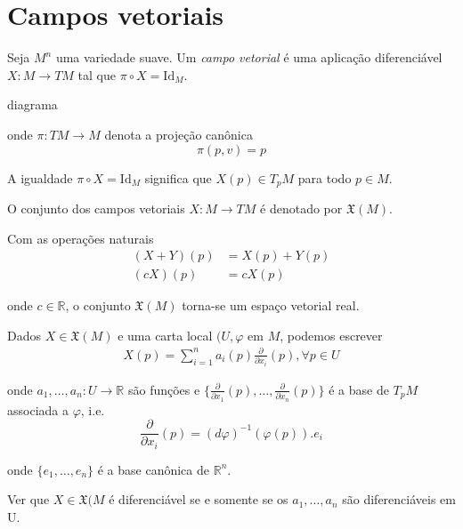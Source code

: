 \section{Campos vetoriais}

\begin{defi}
	Seja $M^n$ uma variedade suave. Um \emph{campo vetorial} é uma aplicação diferenciável $X: M \rightarrow TM$ tal que $\pi \circ X = \text{Id}_M$.
	
	diagrama
	
	onde $\pi: TM \rightarrow M$ denota a projeção canônica
	\begin{equation*}
		\pi(p,v) = p
	\end{equation*}
\end{defi}

\begin{obse}
	A igualdade $\pi \circ X = \text{Id}_M$ significa que $X(p) \in T_p M$ para todo $p \in M$.
\end{obse}

\begin{nota}
	O conjunto dos campos vetoriais $X: M \rightarrow TM$ é denotado por $\mathfrak{X}(M)$.
\end{nota}

\begin{obse}
	Com as operações naturais
	\begin{align*}
		(X+Y)(p) &= X(p) + Y(p)\\
		(cX)(p) &= c X(p)
	\end{align*}
	
	onde $c \in \mathbb{R}$, o conjunto $\mathfrak{X}(M)$ torna-se um espaço vetorial real.
\end{obse}

\begin{obse}
	Dados $X \in \mathfrak{X}(M)$ e uma carta local $(U, \varphi$ em $M$, podemos escrever
	\begin{align*}
		X(p) = \sum_{i=1}^n a_i (p) \frac{\partial}{\partial x_i} (p), \forall p \in U
	\end{align*}
	
	onde $a_1, \ldots, a_n: U \rightarrow \mathbb{R}$ são funções e $\{ \frac{\partial}{\partial x_1}(p), \ldots, \frac{\partial}{\partial x_n}(p) \}$ é a base de $T_p M$ associada a $\varphi$, i.e.
	\begin{equation*}
		\frac{\partial}{\partial x_i} (p) = (d \varphi)^{-1}(\varphi(p)).e_i
	\end{equation*}
	
	onde $\{ e_1, \ldots, e_n \}$ é a base canônica de $\mathbb{R}^n$.
\end{obse}

Ver que $X \in \mathfrak{X}(M$ é diferenciável se e somente se os $a_1, \ldots, a_n$ são diferenciáveis em U.